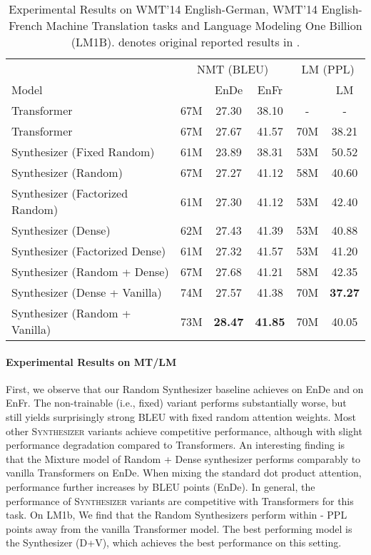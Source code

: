 \documentclass{article}
\begin{document}
\begin{table*}[t]
\centering
\small
    \begin{tabular}{l|ccc|cc}
    \toprule
     &    \multicolumn{3}{c}{NMT (BLEU) } & \multicolumn{2}{c}{LM (PPL)}\\
         Model &  & EnDe & EnFr &  & LM \\
         \midrule
         Transformer
          & 67M &  27.30 & 38.10 & - &- \\
         Transformer & 67M & 27.67  & 41.57 & 70M & 
         38.21\\
\midrule
Synthesizer (Fixed Random)  & 61M & 23.89  & 38.31 & 53M &50.52 \\
         Synthesizer (Random) & 67M & 27.27 & 41.12 & 58M & 40.60 \\
         Synthesizer (Factorized Random) & 61M & 27.30 & 41.12 &53M & 42.40 \\
Synthesizer (Dense)  & 62M & 27.43  & 41.39 & 53M & 40.88 \\
      Synthesizer (Factorized Dense) & 61M & 27.32 & 41.57  & 53M & 41.20  \\
Synthesizer (Random + Dense) & 67M & 27.68 &  41.21 & 58M &42.35 \\ 
        Synthesizer (Dense + Vanilla) & 74M &27.57  & 41.38 & 70M & \textbf{37.27} \\
Synthesizer (Random + Vanilla) & 73M & \textbf{28.47} &  \textbf{41.85} & 70M & 40.05\\
         \bottomrule
    \end{tabular}
    \caption{Experimental Results on WMT'14 English-German, WMT'14 English-French Machine Translation tasks and Language Modeling One Billion (LM1B).  denotes original reported results in \citep{vaswani2017attention}.}
     \label{tab:ende}
     \end{table*}

\paragraph{Experimental Results on MT/LM} First, we observe that our Random Synthesizer baseline achieves  on EnDe and  on EnFr.  The non-trainable (i.e., fixed) variant performs substantially worse, but still yields surprisingly strong  BLEU with fixed random attention weights. Most other \textsc{Synthesizer} variants achieve competitive performance, although with slight performance degradation compared to Transformers. An interesting finding is that the Mixture model of Random + Dense synthesizer performs comparably to vanilla Transformers on EnDe. When mixing the standard dot product attention, performance further increases by  BLEU points (EnDe). In general, the performance of \textsc{Synthesizer} variants are competitive with Transformers for this task. On LM1b, We find that the Random Synthesizers perform within - PPL points away from the vanilla Transformer model. The best performing model is the Synthesizer (D+V), which achieves the best performance on this setting.
\end{document}
